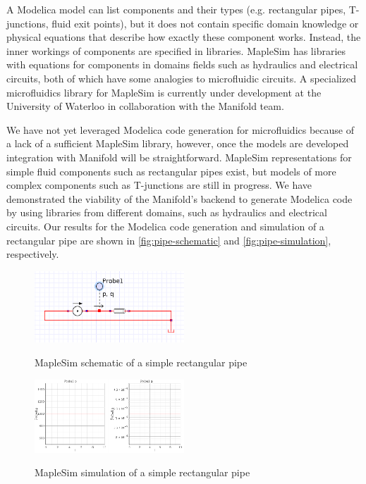 A Modelica model can list components and their types (e.g. rectangular pipes, T-junctions, fluid exit points),
but it does not contain specific domain knowledge or physical equations that describe how exactly these
component works.
Instead, the inner workings of components are specified in libraries.
MapleSim has libraries with equations for components in domains fields such as hydraulics and electrical
circuits, both of which have some analogies to microfluidic circuits.
A specialized microfluidics library for MapleSim is currently under development at the University of Waterloo
in collaboration with the Manifold team.

We have not yet leveraged Modelica code generation for microfluidics because of a lack of a sufficient
MapleSim library, however, once the models are developed integration with Manifold will be straightforward.
MapleSim representations for simple fluid components such as rectangular pipes exist, but models of more complex components such as T-junctions are still in progress.
We have demonstrated the viability of the Manifold's backend to generate Modelica code by using
libraries from different domains, such as hydraulics and electrical circuits. Our results for the Modelica
code generation and simulation of a rectangular pipe are shown in \autoref{fig:pipe-schematic} and
\autoref{fig:pipe-simulation}, respectively.

\begin{figure}[!ht]
  \caption{MapleSim schematic of a simple rectangular pipe}
  \centering
    \includegraphics[width=0.5\textwidth]{img/simple-pipe.png}
	\label{fig:pipe-schematic}
\end{figure}
\begin{figure}[!ht]
  \caption{MapleSim simulation of a simple rectangular pipe}
  \centering
    \includegraphics[width=0.5\textwidth]{img/simple-pipe-simulation.png}
	\label{fig:pipe-simulation}
\end{figure}

